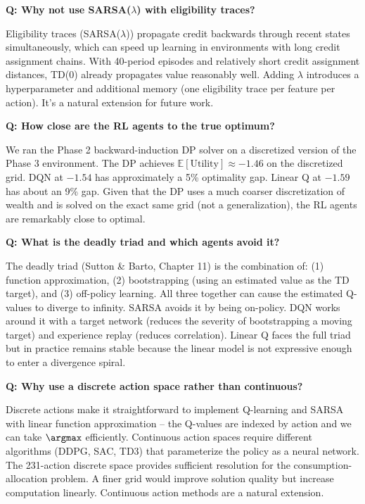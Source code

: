 \documentclass[11pt, letterpaper]{article}
\begin{document}
\textbf{Q: Why not use SARSA($\lambda$) with eligibility traces?}

Eligibility traces (SARSA($\lambda$)) propagate credit backwards through recent states simultaneously, which can speed up learning in environments with long credit assignment chains. With 40-period episodes and relatively short credit assignment distances, TD(0) already propagates value reasonably well. Adding $\lambda$ introduces a hyperparameter and additional memory (one eligibility trace per feature per action). It's a natural extension for future work.

\textbf{Q: How close are the RL agents to the true optimum?}

We ran the Phase 2 backward-induction DP solver on a discretized version of the Phase 3 environment. The DP achieves $\mathbb{E}[\text{Utility}] \approx -1.46$ on the discretized grid. DQN at $-1.54$ has approximately a 5\% optimality gap. Linear Q at $-1.59$ has about an 9\% gap. Given that the DP uses a much coarser discretization of wealth and is solved on the exact same grid (not a generalization), the RL agents are remarkably close to optimal.

\textbf{Q: What is the deadly triad and which agents avoid it?}

The deadly triad (Sutton \& Barto, Chapter 11) is the combination of: (1) function approximation, (2) bootstrapping (using an estimated value as the TD target), and (3) off-policy learning. All three together can cause the estimated Q-values to diverge to infinity. SARSA avoids it by being on-policy. DQN works around it with a target network (reduces the severity of bootstrapping a moving target) and experience replay (reduces correlation). Linear Q faces the full triad but in practice remains stable because the linear model is not expressive enough to enter a divergence spiral.

\textbf{Q: Why use a discrete action space rather than continuous?}

Discrete actions make it straightforward to implement Q-learning and SARSA with linear function approximation -- the Q-values are indexed by action and we can take $\argmax$ efficiently. Continuous action spaces require different algorithms (DDPG, SAC, TD3) that parameterize the policy as a neural network. The 231-action discrete space provides sufficient resolution for the consumption-allocation problem. A finer grid would improve solution quality but increase computation linearly. Continuous action methods are a natural extension.
\end{document}
